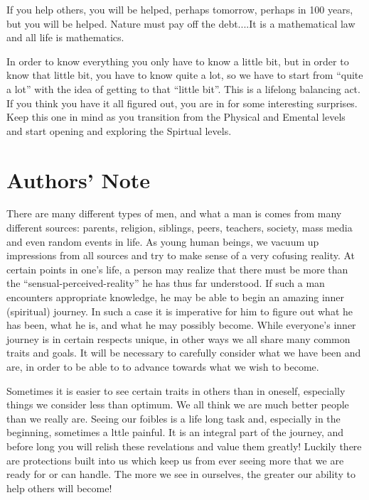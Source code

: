 \documentclass[12pt,letterpaper]{book}
\begin{document}
If you help others, you will be helped, perhaps tomorrow, perhaps in 100 years, but you will be helped. Nature must pay off the debt....It is a mathematical law and all life is mathematics.

In order to know everything you only have to know a little bit, but in order to know that little bit, you have to know quite a lot, so we have to start from ``quite a lot'' with the idea of getting to that ``little bit''. This is a lifelong balancing act. If you think you have it all figured out, you are in for some interesting surprises. Keep this one in mind as you transition from the Physical and Emental levels and start opening and exploring the Spirtual levels.



\chapter{Authors' Note}

There are many different types of men, and what a man is comes from many different sources: parents, religion, siblings, peers, teachers, society, mass media and even random events in life. As young human beings, we vacuum up impressions from all sources and try to make sense of a very cofusing reality. At certain points in one's life, a person may realize that there must be more than the ``sensual-perceived-reality'' he has thus far understood. If such a man encounters appropriate knowledge, he may be able to begin an amazing inner (spiritual) journey. In such a case it is imperative for him to figure out what he has been, what he is, and what he may possibly become. While everyone's inner journey is in certain respects unique, in other ways we all share many common traits and goals. It will be necessary to carefully consider what we have been and are, in order to be able to to advance towards what we wish to become.

Sometimes it is easier to see certain traits in others than in oneself, especially things we consider less than optimum. We all think we are much better people than we really are. Seeing our foibles is a life long task and, especially in the beginning, sometimes a lttle painful. It is an integral part of the journey, and before long you will relish these revelations and value them greatly! Luckily there are protections built into us which keep us from ever seeing more that we are ready for or can handle. The more we see in ourselves, the greater our ability to help others will become!
\end{document}
